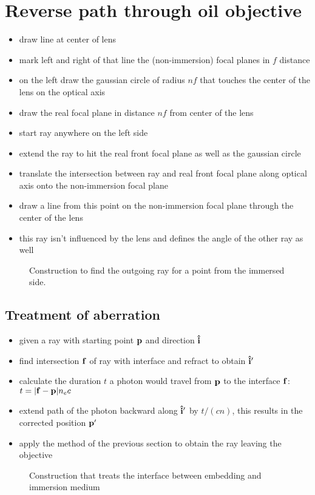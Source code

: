 \section{Reverse path through oil objective}
\begin{itemize}
\item draw line at center of lens
\item mark left and right of that line the (non-immersion) focal
  planes in $f$ distance
\item on the left draw the gaussian circle of radius $nf$ that touches
  the center of the lens on the optical axis
\item draw the real focal plane in distance $nf$ from center of the
  lens
\item start ray anywhere on the left side
\item extend the ray to hit the real front focal plane as well as the
  gaussian circle
\item translate the intersection between ray and real front focal
  plane along optical axis onto the non-immersion focal plane
\item draw a line from this point on the non-immersion focal plane
  through the center of the lens
\item this ray isn't influenced by the lens and defines the angle of
  the other ray as well
\end{itemize}
 \begin{figure}[!hbt]
   \centering
   
   \caption{Construction to find the outgoing ray for a point from the
     immersed side.}
 \end{figure}
\subsection{Treatment of aberration}
\begin{itemize}
\item given a ray with starting point $\mathbf{p}$ and direction $\mathbf{\hat{i}}$
\item find intersection $\mathbf{f}$ of ray with interface and refract to
  obtain $\mathbf{\hat{i}}'$
\item calculate the duration $t$ a photon would travel from $\mathbf{p}$ to
  the interface $\mathbf{f}$: $t=\mathopen| \mathbf{f}-\mathbf{p} \mathclose|n_ec$
\item extend path of the photon backward along $\mathbf{\hat{i}}'$ by $t/(cn)$, this
  results in the corrected position $\mathbf{p}'$
\item apply the method of the previous section to obtain the ray
  leaving the objective
\end{itemize}
 \begin{figure}[!hbt]
   \centering
   
   \caption{Construction that treats the interface between embedding
     and immersion medium}
 \end{figure}
\newpage
